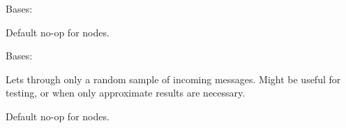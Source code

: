 \documentclass[letterpaper,10pt,english]{sphinxmanual}
\begin{document}

\begin{fulllineitems}
\label{\detokenize{api:nanostream.node.PrinterOfThings}}
Bases: {\hyperref[\detokenize{api:nanostream.node.NanoNode}]{}}

\begin{fulllineitems}
\label{\detokenize{api:nanostream.node.PrinterOfThings.process_item}}
Default no-op for nodes.

\end{fulllineitems}


\end{fulllineitems}


\begin{fulllineitems}
\label{\detokenize{api:nanostream.node.RandomSample}}
Bases: {\hyperref[\detokenize{api:nanostream.node.NanoNode}]{}}

Lets through only a random sample of incoming messages. Might be useful
for testing, or when only approximate results are necessary.

\begin{fulllineitems}
\label{\detokenize{api:nanostream.node.RandomSample.process_item}}
Default no-op for nodes.

\end{fulllineitems}


\end{fulllineitems}

\end{document}
